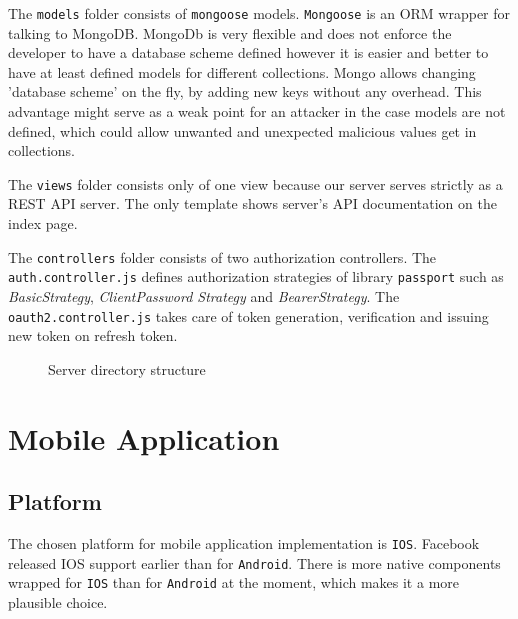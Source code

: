 \documentclass[thesis=M,english]{FITthesis}[2012/10/20]
\begin{document}
The \verb|models| folder consists of \verb|mongoose| models. \verb|Mongoose| is an ORM wrapper for talking to MongoDB. MongoDb is very flexible and does not enforce the developer to have a database scheme defined however it is easier and better to have at least defined models for different collections. Mongo allows changing 'database scheme' on the fly, by adding new keys without any overhead. This advantage might serve as a weak point for an attacker in the case models are not defined, which could allow unwanted and unexpected malicious values get in collections.

The \verb|views| folder consists only of one view because our server serves strictly as a REST API server. The only template shows server's API documentation on the index page.

The \verb|controllers| folder consists of two authorization controllers. The \verb|auth.controller.js| defines authorization strategies of library \verb|passport| such as \textit{BasicStrategy}, \textit{ClientPassword Strategy} and \textit{BearerStrategy}. The \verb|oauth2.controller.js| takes care of token generation, verification and issuing new token on refresh token.

\begin{figure}
	\caption{Server directory structure}	
	\label{fig:server_dir}
\end{figure}

\newpage
\section{Mobile Application}

\subsection{Platform}

The chosen platform for mobile application implementation is \verb|IOS|. Facebook released IOS support earlier than for \verb|Android|. There is more native components wrapped for \verb|IOS| than for \verb|Android| at the moment, which makes it a more plausible choice.
\end{document}
